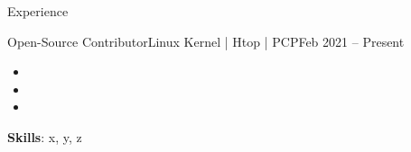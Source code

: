 \documentclass[]{Sohaib-Mohamed}
\begin{document}
\begin{cvsection}{Experience}
\begin{cvsubsection}{Open-Source Contributor}{Linux Kernel | Htop | PCP}{Feb 2021 -- Present}
\begin{itemize}
         \item
         \item
         \item
      \end{itemize}
      \textbf{Skills}: x, y, z
   \end{cvsubsection}
\end{cvsection}

\end{document}
